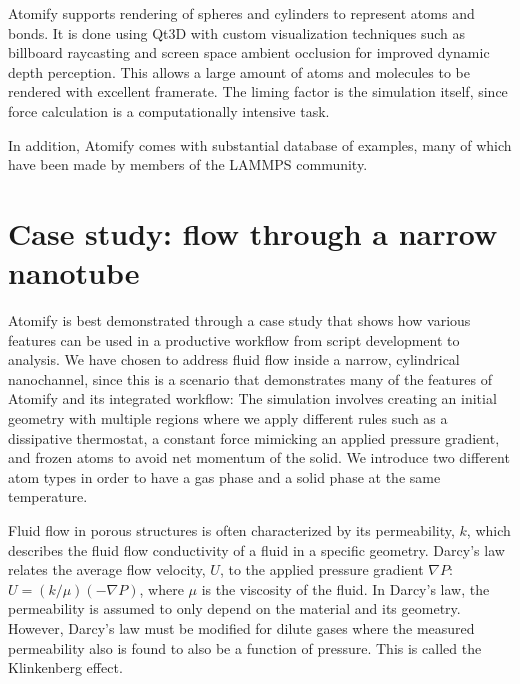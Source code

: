 \documentclass[12pt,a4paper,final]{iopart}
\begin{document}
Atomify supports rendering of spheres and cylinders to represent atoms and bonds.
It is done using Qt3D with custom visualization techniques such as
billboard raycasting\cite{gumhold2003splatting, sigg2006gpu, tarini2006ambient} and screen space ambient occlusion\cite{bavoil2008screen}
for improved dynamic depth perception. This allows a large amount of atoms and molecules to be rendered with excellent framerate.
The liming factor is the simulation itself, since force calculation is a computationally intensive task.

In addition, Atomify comes with substantial database of examples,
many of which have been made by members of the LAMMPS community.

\section{\label{sec:casestudy}Case study: flow through a narrow nanotube}
Atomify is best demonstrated through a case study that shows how 
various features can be used in a productive workflow from script development to analysis.
We have chosen to address fluid flow inside a narrow, cylindrical nanochannel, since this is a scenario that demonstrates many of the features of Atomify and its integrated workflow: The simulation involves creating an initial geometry with multiple regions 
where we apply different rules such as a dissipative thermostat, a constant force mimicking
an applied pressure gradient, and frozen atoms to avoid net momentum of the solid.
We introduce two different atom types in order to have a gas phase and a solid phase at the same temperature.

Fluid flow in porous structures is often characterized by its permeability, $k$, which describes the fluid flow conductivity of a fluid in a specific geometry. Darcy's law relates the average flow velocity, $U$, to the applied pressure gradient $\nabla P$: $U = (k/\mu)(-\nabla P)$, where $\mu$ is the viscosity of the fluid. In Darcy's law, the permeability is assumed to only depend on the material and its geometry. 
However, Darcy's law must be modified for dilute
gases where the measured permeability also is found to also be a function of pressure.
This is called the Klinkenberg effect\cite{klinkenberg1941permeability}.
\end{document}
